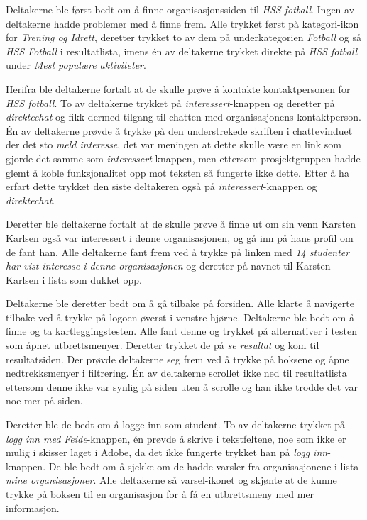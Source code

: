 Deltakerne ble først bedt om å finne organisasjonssiden til {\em HSS fotball}. Ingen av deltakerne hadde problemer med å finne frem. Alle trykket først på kategori-ikon for {\em Trening og Idrett}, deretter trykket to av dem på underkategorien {\em Fotball} og så {\em HSS Fotball} i resultatlista, imens én av deltakerne trykket direkte på {\em HSS fotball} under {\em Mest populære aktiviteter}. 

Herifra ble deltakerne fortalt at de skulle prøve å kontakte kontaktpersonen for {\em HSS fotball}. To av deltakerne trykket på {\em interessert}-knappen og deretter på {\em direktechat} og fikk dermed tilgang til chatten med organisasjonens kontaktperson. Én av deltakerne prøvde å trykke på den understrekede skriften i chattevinduet der det sto {\em meld interesse}, det var meningen at dette skulle være en link som gjorde det samme som {\em interessert}-knappen, men ettersom prosjektgruppen hadde glemt å koble funksjonalitet opp mot teksten så fungerte ikke dette. Etter å ha erfart dette trykket den siste deltakeren også på {\em interessert}-knappen og {\em direktechat}.

Deretter ble deltakerne fortalt at de skulle prøve å finne ut om sin venn Karsten Karlsen også var interessert i denne organisasjonen, og gå inn på hans profil om de fant han. Alle deltakerne fant frem ved å trykke på linken med {\em 14 studenter har vist interesse i denne organisasjonen} og deretter på navnet til Karsten Karlsen i lista som dukket opp.

Deltakerne ble deretter bedt om å gå tilbake på forsiden. Alle klarte å navigerte tilbake ved å trykke på logoen øverst i venstre hjørne. Deltakerne ble bedt om å finne og ta kartleggingstesten. Alle fant denne og trykket på alternativer i testen som åpnet utbrettsmenyer. Deretter trykket de på {\em se resultat} og kom til resultatsiden. Der prøvde deltakerne seg frem ved å trykke på boksene og åpne nedtrekksmenyer i filtrering. Én av deltakerne scrollet ikke ned til resultatlista ettersom denne ikke var synlig på siden uten å scrolle og han ikke trodde det var noe mer på siden.

Deretter ble de bedt om å logge inn som student. To av deltakerne trykket på {\em logg inn med Feide}-knappen, én prøvde å skrive i tekstfeltene, noe som ikke er mulig i skisser laget i Adobe, da det ikke fungerte trykket han på {\em logg inn}-knappen. De ble bedt om å sjekke om de hadde varsler fra organisasjonene i lista {\em mine organisasjoner}. Alle deltakerne så varsel-ikonet og skjønte at de kunne trykke på boksen til en organisasjon for å få en utbrettsmeny med mer informasjon.

